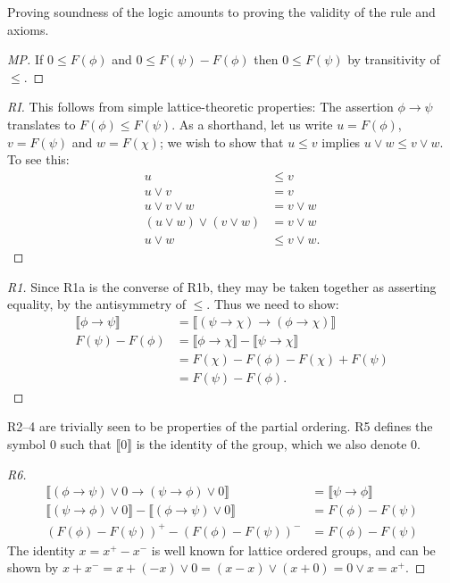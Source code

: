 \documentclass[preprint,leqno]{elsarticle}
\newcommand{\interp}[1]{\llbracket #1 \rrbracket}
\begin{document}
Proving soundness of the logic amounts to proving the validity of the
rule and axioms.


\begin{proof}[MP]
If $0 \le F(\phi)$ and $0 \le F(\psi) - F(\phi)$ then
$0 \le F(\psi)$ by transitivity of $\le$.
\end{proof}

\begin{proof}[RI]
  This follows from simple lattice-theoretic properties: The assertion
  $\phi \rightarrow \psi$ translates to $F(\phi) \le F(\psi)$. As a
  shorthand, let us write $u = F(\phi)$, $v = F(\psi)$ and $w =
  F(\chi)$; we wish to show that $u\le v$ implies $u\lor w \le v \lor
  w$. To see this:
  \begin{align*}
    u &\le v\\
    u\lor v &= v\\
    u\lor v\lor w &= v\lor w\\
    (u\lor w)\lor (v\lor w) &= v\lor w\\
    u\lor w &\le v\lor w.
  \end{align*}
\end{proof}

\begin{proof}[R1]
  Since R1a is the converse of R1b, they may be taken together as
  asserting equality, by the antisymmetry of $\le$. Thus we need to
  show:
  \begin{align*}
    \interp{\phi \rightarrow \psi} & = \interp{(\psi \rightarrow
      \chi) \rightarrow (\phi \rightarrow \chi)}\\
    F(\psi) - F(\phi) & = \interp{\phi \rightarrow \chi} -
    \interp{\psi \rightarrow \chi}\\
    & = F(\chi) - F(\phi) - F(\chi) + F(\psi)\\
    & = F(\psi) - F(\phi).
  \end{align*}
\end{proof}
R2--4 are trivially seen to be properties of the partial ordering. R5
defines the symbol 0 such that $\interp{0}$ is the identity of the
group, which we also denote 0.

\begin{proof}[R6]
\begin{align*}
  \interp{(\phi \rightarrow \psi)\lor 0 \rightarrow (\psi \rightarrow \phi) \lor 0} &= \interp{\psi \rightarrow \phi}\\
  \interp{(\psi \rightarrow \phi) \lor 0} - \interp{(\phi \rightarrow \psi)\lor 0} &= F(\phi) - F(\psi)\\
  (F(\phi) - F(\psi))^+ - (F(\phi) - F(\psi))^- & =F(\phi) - F(\psi)
\end{align*}
The identity $x = x^+ - x^-$ is
well known for lattice ordered groups, and can be shown by $x + x^- =
x + (-x)\lor 0 = (x - x)\lor(x + 0) = 0\lor x = x^+$.
\end{proof}
\end{document}
